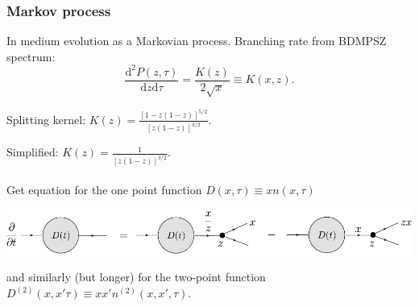 \documentclass[pstricks,mathserif]{beamer}
\newcommand{\party}[2]{\frac{\partial{#1}}{\partial{#2}}}
\begin{document}
\begin{frame}
\frametitle{Markov process}
In medium evolution as a Markovian process. Branching rate from BDMPSZ spectrum:
$$\frac{\mathrm{d}^2 P(z,\tau)}{\mathrm{d}z\mathrm{d}\tau}=\frac{K(z)}{2 \sqrt{x}} \equiv K(x,z).$$


Splitting kernel: $K(z)=\frac{[1-z(1-z)]^{5/2}}{[z(1-z)]^{3/2}}$. 

Simplified: $K(z)=\frac{1}{[z(1-z)]^{3/2}}$.\\
~\\


Get equation for the one point function
$D(x,\tau)\equiv xn(x,\tau)$ 

\begin{center}
\includegraphics[width=0.9\linewidth]{RateEq_D.pdf}
\end{center}


and similarly (but longer) for the two-point function $D^{(2)}(x,x'\tau)\equiv xx'n^{(2)}(x,x',\tau)$.

\end{frame}
\end{document}
